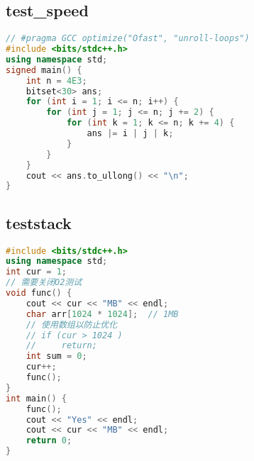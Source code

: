 \subsection{test\_speed}
\begin{lstlisting}[language=C++]
// #pragma GCC optimize("Ofast", "unroll-loops")
#include <bits/stdc++.h>
using namespace std;
signed main() {
    int n = 4E3;
    bitset<30> ans;
    for (int i = 1; i <= n; i++) {
        for (int j = 1; j <= n; j += 2) {
            for (int k = 1; k <= n; k += 4) {
                ans |= i | j | k;
            }
        }
    }
    cout << ans.to_ullong() << "\n";
}
\end{lstlisting}
\subsection{teststack}
\begin{lstlisting}[language=C++]
#include <bits/stdc++.h>
using namespace std;
int cur = 1;
// 需要关闭O2测试
void func() {
    cout << cur << "MB" << endl;
    char arr[1024 * 1024];  // 1MB
    // 使用数组以防止优化
    // if (cur > 1024 )
    //     return;
    int sum = 0;
    cur++;
    func();
}
int main() {
    func();
    cout << "Yes" << endl;
    cout << cur << "MB" << endl;
    return 0;
}

\end{lstlisting}
